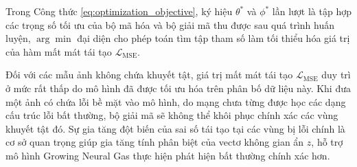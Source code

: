 Trong Công thức \ref{eq:optimization_objective}, ký hiệu $\theta^*$ và $\phi^*$ lần lượt là tập hợp các trọng số tối ưu của bộ mã hóa và bộ giải mã thu được sau quá trình huấn luyện, $\arg\min$ đại diện cho phép toán tìm tập tham số làm tối thiểu hóa giá trị của hàm mất mát tái tạo $\mathcal{L}_{\text{MSE}}$.

Đối với các mẫu ảnh không chứa khuyết tật, giá trị mất mát tái tạo $\mathcal{L}_{\text{MSE}}$ duy trì ở mức rất thấp do mô hình đã được tối ưu hóa trên phân bố dữ liệu này. Khi đưa một ảnh có chứa lỗi bề mặt vào mô hình, do mạng chưa từng được học các dạng cấu trúc lỗi bất thường, bộ giải mã sẽ không thể khôi phục chính xác các vùng khuyết tật đó. Sự gia tăng đột biến của sai số tái tạo tại các vùng bị lỗi chính là cơ sở quan trọng giúp gia tăng tính phân biệt của vectơ không gian ẩn $z$, hỗ trợ mô hình Growing Neural Gas thực hiện phát hiện bất thường chính xác hơn.